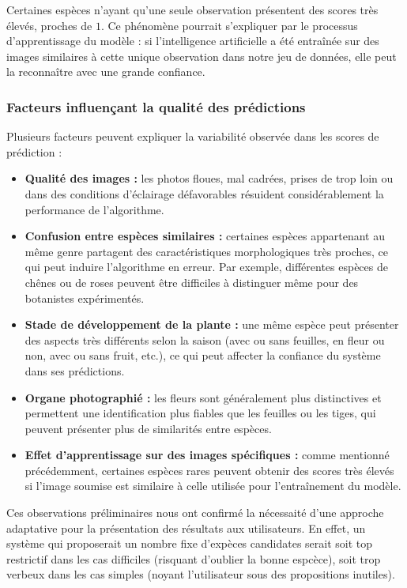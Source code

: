 \documentclass[a4paper,12pt]{article}
\begin{document}
\vspace{0.2cm}

Certaines espèces n'ayant qu'une seule observation présentent des scores très élevés, proches de $1$. Ce phénomène pourrait s'expliquer par le processus d'apprentissage du modèle : si l'intelligence artificielle a été entraînée sur des images similaires à cette unique observation dans notre jeu de données, elle peut la reconnaître avec une grande confiance.

\subsubsection{Facteurs influençant la qualité des prédictions}

Plusieurs facteurs peuvent expliquer la variabilité observée dans les scores de prédiction : 
\begin{itemize}
    \item \textbf{Qualité des images :} les photos floues, mal cadrées, prises de trop loin ou dans des conditions d'éclairage défavorables résuident considérablement la performance de l'algorithme.
    \item \textbf{Confusion entre espèces similaires :} certaines espèces appartenant au même genre partagent des caractéristiques morphologiques très proches, ce qui peut induire l'algorithme en erreur. Par exemple, différentes espèces de chênes ou de roses peuvent être difficiles à distinguer même pour des botanistes expérimentés.
    \item \textbf{Stade de développement de la plante :} une même espèce peut présenter des aspects très différents selon la saison (avec ou sans feuilles, en fleur ou non, avec ou sans fruit, etc.), ce qui peut affecter la confiance du système dans ses prédictions.
    \item \textbf{Organe photographié :} les fleurs sont généralement plus distinctives et permettent une identification plus fiables que les feuilles ou les tiges, qui peuvent présenter plus de similarités entre espèces.
    \item \textbf{Effet d'apprentissage sur des images spécifiques :} comme mentionné précédemment, certaines espèces rares peuvent obtenir des scores très élevés si l'image soumise est similaire à celle utilisée pour l'entraînement du modèle.
\end{itemize}

\vspace{0.2cm}

Ces observations préliminaires nous ont confirmé la nécessaité d'une approche adaptative pour la présentation des résultats aux utilisateurs. En effet, un système qui proposerait un nombre fixe d'expèces candidates serait soit top restrictif dans les cas difficiles (risquant d'oublier la bonne espcèce), soit trop verbeux dans les cas simples (noyant l'utilisateur sous des propositions inutiles).
\end{document}
